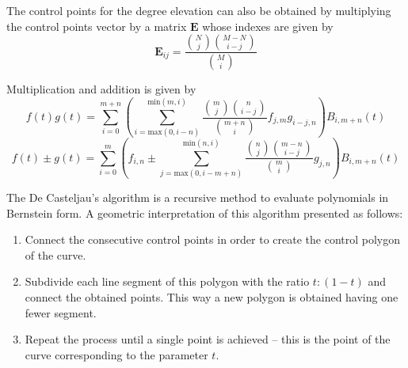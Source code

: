 \par The control points for the degree elevation can also be obtained by multiplying the control points vector by a matrix $\boldsymbol{E}$ whose indexes are given by 
\begin{equation}
    \label{eq:bernsteinelevindexes}
    \boldsymbol{E}_{ij} = \frac{{N\choose j}{M-N\choose i-j}}{{M\choose i}}
\end{equation}


\par Multiplication and addition is given by
\begin{equation}
    \label{eq:bern_mul}
    f(t)g(t) = \sum^{m+n}_{i=0}  \left(\sum_{i=\text{max}(0,i-n)}^{\text{min}(m,i)} \frac{\binom{m}{j}\binom{n}{i-j}}{\binom{m+n}{i}} f_{j,m}g_{i-j,n}\right) B_{i,m+n}(t)
\end{equation}
\begin{equation}
    \label{eq:bern_sum}
    f(t)\pm g(t) = 
    \sum^{m}_{i=0}  \left(f_{i,n} \pm \sum_{j=\text{max}(0,i-m+n)}^{\text{min}(n,i)} \frac{\binom{n}{j}\binom{m-n}{i-j}}{\binom{m}{i}} g_{j,n}\right) B_{i,m+n}(t)
\end{equation}

\par The De Casteljau's algorithm is a recursive method to evaluate polynomials in Bernstein form. A geometric interpretation of this algorithm presented as follows:
\begin{enumerate}
    \item Connect the consecutive control points in order to create the control polygon of the curve.
	\item Subdivide each line segment of this polygon with the ratio $t:(1-t)$ and connect the obtained points. This way a new polygon is obtained having one fewer segment.
    \item Repeat the process until a single point is achieved – this is the point of the curve corresponding to the parameter $t$.
\end{enumerate}

